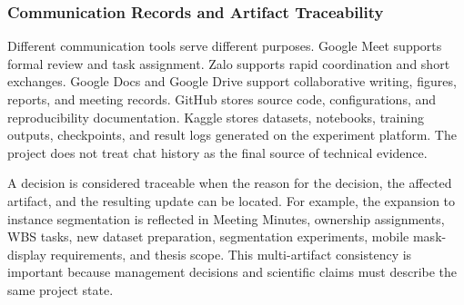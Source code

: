\subsubsection{Communication Records and Artifact Traceability}
Different communication tools serve different purposes. Google Meet supports formal review and task assignment. Zalo supports rapid coordination and short exchanges. Google Docs and Google Drive support collaborative writing, figures, reports, and meeting records. GitHub stores source code, configurations, and reproducibility documentation. Kaggle stores datasets, notebooks, training outputs, checkpoints, and result logs generated on the experiment platform. The project does not treat chat history as the final source of technical evidence.\par
A decision is considered traceable when the reason for the decision, the affected artifact, and the resulting update can be located. For example, the expansion to instance segmentation is reflected in Meeting Minutes, ownership assignments, WBS tasks, new dataset preparation, segmentation experiments, mobile mask-display requirements, and thesis scope. This multi-artifact consistency is important because management decisions and scientific claims must describe the same project state.\par
